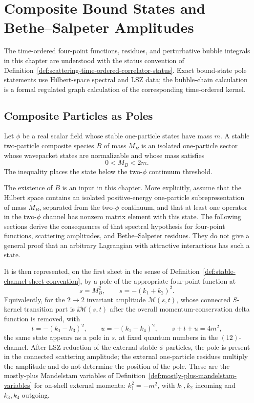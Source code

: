 \chapter{Composite Bound States and Bethe--Salpeter Amplitudes}
\label{ch:volume-ii-composite-bound-states-bethe-salpeter}
\ConventionsLorentzian

The time-ordered four-point functions, residues, and perturbative bubble
integrals in this chapter are understood with the status convention of
Definition~\ref{def:scattering-time-ordered-correlator-status}.  Exact
bound-state pole statements use Hilbert-space spectral and LSZ data; the
bubble-chain calculation is a formal regulated graph calculation of the
corresponding time-ordered kernel.


\section{Composite Particles as Poles}

Let \(\phi\) be a real scalar field whose stable one-particle states have
mass \(m\). A stable two-particle composite species \(B\) of mass \(M_B\) is an
isolated one-particle sector whose wavepacket states are normalizable and whose
mass satisfies
\[
  0<M_B<2m .
\]
The inequality places the state below the two-\(\phi\) continuum threshold.

\begin{assumption}
The existence of \(B\) is an input in this chapter.  More explicitly, assume
that the Hilbert space contains an isolated positive-energy one-particle
subrepresentation of mass \(M_B\), separated from the two-\(\phi\) continuum,
and that at least one operator in the two-\(\phi\) channel has nonzero matrix
element with this state.  The following sections derive the consequences of
that spectral hypothesis for four-point functions, scattering amplitudes, and
Bethe--Salpeter residues.  They do not give a general proof that an arbitrary
Lagrangian with attractive interactions has such a state.
\end{assumption}

It is then represented, on the first sheet in the sense of
Definition~\ref{def:stable-channel-sheet-convention}, by a pole of the appropriate
four-point function at
\[
  s=M_B^2,
  \qquad
  s=-(k_1+k_2)^2 .
\]
Equivalently, for the \(2\to2\) invariant amplitude \(\mathcal M(s,t)\), whose
connected \(S\)-kernel transition part is \(\ii\mathcal M(s,t)\) after the
overall momentum-conservation delta function is removed, with
\[
  t=-(k_1-k_3)^2 ,
  \qquad
  u=-(k_1-k_4)^2 ,
  \qquad
  s+t+u=4m^2 ,
\]
the same state appears as a pole in \(s\), at fixed quantum numbers in the
\((12)\)-channel. After LSZ reduction of the external stable \(\phi\)
particles, the pole is present in the connected scattering amplitude; the
external one-particle residues multiply the amplitude and do not determine the
position of the pole.
These are the mostly-plus Mandelstam variables of
Definition~\ref{def:mostly-plus-mandelstam-variables} for on-shell external
momenta: \(k_i^2=-m^2\), with \(k_1,k_2\) incoming and \(k_3,k_4\) outgoing.

